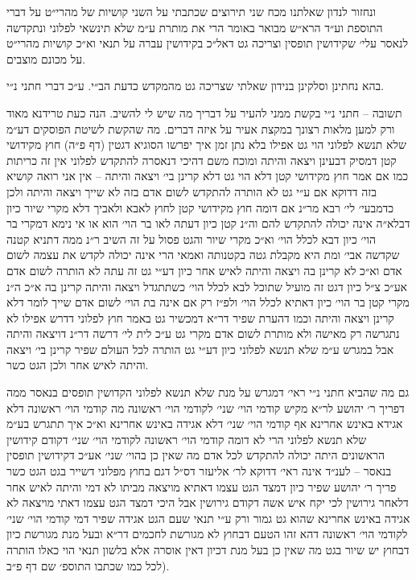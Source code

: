 \documentclass[12pt, openany]{book}
\begin{document}
\begin{multicols}{2}
ונחזור לנדון שאלתנו מכח שני תירוצים שכתבתי על השני קושיות של מהרי״ט על דברי התוספת וע״ד הרא״ש מבואר באומר הרי את מותרת ע״מ שלא תינשאי לפלוני ונתקדשה לנאסר עלי׳ שקידושין תופסין וצריכה גט דאל״כ בקידושין עברה על תנאי וא״כ קושיות מהרי״ט על מכונם מוצבים.\\\vspace{0pt}

בהא נחתינן וסלקינן בנידון שאלתי שצריכה גט מהמקדש כדעת הב״י. ע״כ דברי חתני נ״י.\\\vspace{0pt}

תשובה – חתני נ״י בקשת ממני להעיר על דבריך מה שיש לי להשיב. הנה כעת טרידנא מאוד ורק למען מלאות רצונך במקצת אעיר על איזה דברים. מה שהקשת לשיטת הפוסקים דע״מ שלא תנשא לפלוני הוי גט אפילו בלא נתן זמן איך יפרשו הסוגיא דגטין (דף פ״ה) חוץ מקידושי קטן דמסיק דבעינן ויצאה והיתה ומוכח משם דהיכי דנאסרה להתקדש לפלוני אין זה כריתות כמו אם אמר חוץ מקידושי קטן דלא הוי גט דלא קרינן בי׳ ויצאה והיתה – אין אני רואה קושיא בזה דדוקא אם ע״י גט לא הותרה להתקדש לשום אדם בזה לא שייך ויצאה והיתה ולכן כדמבעי׳ לי׳ רבא מר״נ אם דומה חוץ מקידושי קטן לחוץ לאבא ולאביך דלא מקרי שיור כיון דבלא״ה אינה יכולה להתקדש להם וה״נ קטן כיון דעתה לאו בר הוי׳ הוא או אי נימא דמקרי בר הוי׳ כיון דבא לכלל הוי׳ וא״כ מקרי שיור והגט פסול על זה השיב ר״נ ממה דתניא קטנה שקדשה אבי׳ ומת היא מקבלת גטה בקטנותה ואמאי הרי אינה יכולה לקדש את עצמה לשום אדם וא״כ לא קרינן בה ויצאה והיתה לאיש אחר כיון דע״י גט זה עתה לא הותרה לשום אדם אע״כ צ״ל כיון דגט זה מועיל שתוכל לבא לכלל הוי׳ כשתתגדל ויצאה והיתה קרינן בה א״כ ה״נ מקרי קטן בר הוי׳ כיון דאתיא לכלל הוי׳ ולפ״ז רק אם אינה בת הוי׳ לשום אדם שייך לומר דלא קרינן ויצאה והיתה וכמו דהערת שפיר דר״א דמכשיר גט באמר חוץ לפלוני דדרש אפילו לא נתגרשה רק מאישה ולא מותרת לשום אדם מקרי גט ע״כ לית לי׳ דרשה דר״נ דויצאה והיתה אבל במגרש ע״מ שלא תנשא לפלוני כיון דע״י גט הותרה לכל העולם שפיר קרינן בי׳ ויצאה והיתה לאיש אחר ולכן הגט כשר.\\\vspace{0pt}

גם מה שהביא חתני נ״י ראי׳ דמגרש על מנת שלא תנשא לפלוני הקדושין תופסים בנאסר ממה דפריך ר׳ יהושע לר״א מקיש קודמי הוי׳ שני׳ לקודמי הוי׳ ראשונה מה קודמי הוי׳ ראשונה דלא אגידא באינש אחרינא אף קודמי הוי׳ שני׳ דלא אגידה באינש אחרינא וא״כ איך תתגרש בע״מ שלא תנשא לפלוני הרי לא דומה קודמי הוי׳ ראשונה לקודמי הוי׳ שני׳ דקודם קידושין הראשונים היתה יכולה להתקדש לכל אדם מה שאין כן בהוי׳ שני׳ אע״כ דקידושין תופסין בנאסר – לענ״ד אינה ראי׳ דדוקא לר׳ אליעזר דס״ל דגם בחוץ מפלוני דשייר בגט הגט כשר פריך ר׳ יהושע שפיר כיון דמצד הגט עצמו דאתיא מויצאה מביתו לא דמי והיתה לאיש אחר דלאחר גירושין לכי יקח איש אשה דקודם גירושין אבל היכי דמצד הגט עצמו דאתי מויצאה לא אגידה באינש אחרינא שהוא גט גמור ורק ע״י תנאי שעם הגט אגידה שפיר דמי קודמי הוי׳ שני׳ לקודמי הוי׳ ראשונה דהא זהו הטעם דבחוץ לא מגורשת לחכמים דר״א ובעל מנת מגורשת כיון דבחוץ יש שיור בגט מה שאין כן בעל מנת דכיון דאין אוסרה אלא בלשון תנאי הוי כאלו הותרה לכל כמו שכתבו התוספ׳ שם דף פ״ב).\\\vspace{0pt}


\end{multicols}
\end{document}
